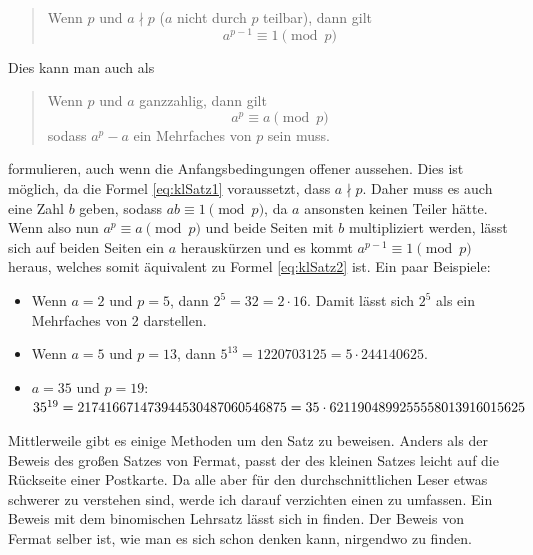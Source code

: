\begin{quote}
    Wenn $p$  und $a \nmid p$ ($a$ nicht durch $p$ teilbar), dann gilt
    \begin{equation} \label{eq:klSatz1}
        a^{p-1} \equiv 1 \pmod{p}
    \end{equation}
\end{quote}

\noindent Dies kann man auch als

\begin{quote}
    Wenn $p$  und $a$ ganzzahlig, dann gilt
    \begin{equation} \label{eq:klSatz2}
        a^p \equiv a \pmod{p}
    \end{equation}
    sodass $a^p - a$ ein Mehrfaches von $p$ sein muss.
\end{quote}

\noindent formulieren, auch wenn die Anfangsbedingungen offener aussehen. Dies ist möglich, da die Formel \ref{eq:klSatz1} voraussetzt, dass $a \nmid p$. Daher muss es auch eine Zahl $b$ geben, sodass $ab \equiv 1 \pmod{p}$, da $a$ ansonsten keinen Teiler hätte. Wenn also nun $a^p \equiv a \pmod{p}$ und beide Seiten mit $b$ multipliziert werden, lässt sich auf beiden Seiten ein $a$ herauskürzen und es kommt $a^{p-1} \equiv 1 \pmod{p}$ heraus, welches somit äquivalent zu Formel \ref{eq:klSatz2} ist. Ein paar Beispiele:

\begin{itemize}
    \item Wenn $a=2$ und $p=5$, dann $2^{5} = 32 = 2 \cdot 16$. Damit lässt sich $2^{5}$ als ein Mehrfaches von 2 darstellen.
    \item Wenn $a=5$ und $p=13$, dann $5^{13} = 1220703125 = 5 \cdot 244140625$.
    \item $a=35$ und $p=19$: \quad $35^{19} = 217416671473944530487060546875 \\ = 35 \cdot 6211904899255558013916015625$
\end{itemize}

Mittlerweile gibt es einige Methoden um den Satz zu beweisen. Anders als der Beweis des großen Satzes von Fermat, passt der des kleinen Satzes leicht auf die Rückseite einer Postkarte. Da alle aber für den durchschnittlichen Leser etwas schwerer zu verstehen sind, werde ich darauf verzichten einen zu umfassen. Ein Beweis mit dem binomischen Lehrsatz lässt sich in \cite{wolframFlT} finden. Der Beweis von Fermat selber ist, wie man es sich schon denken kann, nirgendwo zu finden.

